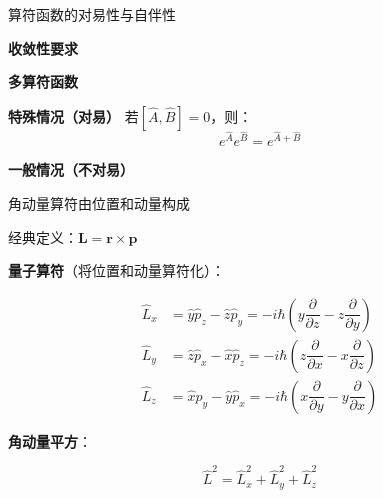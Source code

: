 \begin{frame}{算符函数的对易性与自伴性}

  

    \begin{iqbitemize}
    \item \textbf{收敛性要求}

    \item \textbf{多算符函数}

    \item \textbf{特殊情况（对易）}
    若$[\hat{A}, \hat{B}] = 0$，则：
    \[
      e^{\hat{A}}e^{\hat{B}} = e^{\hat{A}+\hat{B}}
    \]

    \item \textbf{一般情况（不对易）}
    \end{iqbitemize}

    \iqbsep

  

\end{frame}

\begin{frame}{角动量算符由位置和动量构成}
  
    \begin{iqbitemize}
    \item 经典定义：$\mathbf{L} = \mathbf{r} \times \mathbf{p}$
    \item \textbf{量子算符}（将位置和动量算符化）：
    \end{iqbitemize}
      \footnotesize
      \[
        \begin{aligned}
          \hat{L}_x &= \hat{y}\hat{p}_z - \hat{z}\hat{p}_y = -i\hbar\left(y\dfrac{\partial}{\partial z} - z\dfrac{\partial}{\partial y}\right) \\
          \hat{L}_y &= \hat{z}\hat{p}_x - \hat{x}\hat{p}_z = -i\hbar\left(z\dfrac{\partial}{\partial x} - x\dfrac{\partial}{\partial z}\right) \\
          \hat{L}_z &= \hat{x}\hat{p}_y - \hat{y}\hat{p}_x = -i\hbar\left(x\dfrac{\partial}{\partial y} - y\dfrac{\partial}{\partial x}\right)
        \end{aligned}
      \]
    \begin{iqbitemize}
    \item \textbf{角动量平方}：
    \end{iqbitemize}
      \[
        \hat{L}^2 = \hat{L}_x^2 + \hat{L}_y^2 + \hat{L}_z^2
      \]
  
\end{frame}

